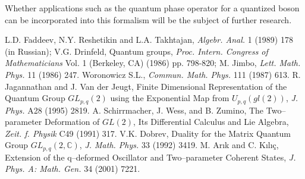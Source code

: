\documentclass[a4paper,12pt]{article}
\numberwithin{equation}{section}
\begin{document}
 Whether applications such as the quantum phase operator for a quantized boson
 can be incorporated into this formalism will be the subject of further research.
\begin{thebibliography}{9}
L.D. Faddeev, N.Y. Reshetikin and L.A. Takhtajan, \emph{Algebr. Anal.} 1 (1989) 178 (in Russian);
 V.G. Drinfeld, Quantum groups, \emph{Proc. Intern. Congress of Mathematicians} Vol. 1 (Berkeley, CA) (1986) pp. 798-820;
 M. Jimbo, \emph{Lett. Math. Phys.} 11 (1986) 247.
Woronowicz S.L., \emph{Commun. Math. Phys.} 111 (1987) 613.
R. Jagannathan and J. Van der Jeugt, Finite Dimensional Representation of the Quantum
 Group $GL_{p,q} \left( 2 \right)$ using the Exponential Map from $U_{p,q} \left( gl
  \left( 2 \right) \right)$, {\em J. Phys.} A28 (1995) 2819.
A. Schirrmacher, J. Wess, and B. Zumino, The Two--parameter Deformation of $GL\left( 2 \right)$,
 Its Differential Calculus and Lie Algebra, \emph{Zeit. f. Physik} C49 (1991) 317.
V.K. Dobrev, Duality for the Matrix Quantum Group $GL_{p,q}\left( 2, \mathbb{C} \right)$,
 \emph{J. Math. Phys.} 33 (1992) 3419.
M. Ar\i k and C. K\i l\i \c{c}, Extension of the q--deformed Oscillator and Two--parameter Coherent States,
 \emph{J. Phys. A: Math. Gen.} 34 (2001) 7221.
\end{thebibliography}
\end{document}
